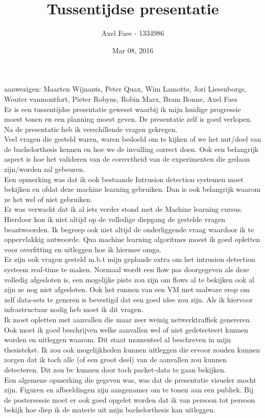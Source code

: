 \documentclass[notitlepage]{article}
\title{Tussentijdse presentatie}
\author{Axel Faes - 1334986}
\date{Mar 08, 2016}
\begin{document}
\maketitle

aanwezigen: Maarten Wijnants, Peter Quax, Wim Lamotte, Jori Liesenborgs, Wouter vanmontfort, Pieter Robyns, Robin Marx, Bram Bonne, Axel Faes\\

Er is een tussentijdse presentatie geweest waarbij ik mijn huidige progressie moest tonen en een planning moest geven. De presentatie zelf is goed verlopen. Na de presentatie heb ik verschillende vragen gekregen. \\

Veel vragen die gesteld waren, waren bedoeld om te kijken of we het nut/doel van de bachelorthesis kennen en hoe we de invulling correct doen. Ook een belangrijk aspect is hoe het valideren van de correctheid van de experimenten die gedaan zijn/worden zal gebeuren. \\

Een opmerking was dat ik ook bestaande Intrusion detection systemen moet bekijken en ofdat deze machine learning gebruiken. Dan is ook belangrijk waarom ze het wel of niet gebruiken. \\

Er was verwacht dat ik al iets verder stond met de Machine learning cursus. Hierdoor kon ik niet altijd op de volledige diepgang de gestelde vragen beantwoorden. Ik begreep ook niet altijd de onderliggende vraag waardoor ik te oppervlakkig antwoorde. Qua machine learning algoritmes moest ik goed opletten voor overfitting en uitleggen hoe ik hiermee omga.\\

Er zijn ook vragen gesteld m.b.t mijn geplande extra om het intrusion detection systeem real-time te maken. Normaal wordt een flow pas doorgegeven als deze volledig afgesloten is, een mogelijke piste zou zijn om flows al te bekijken ook al zijn ze nog niet afgesloten. Ook het runnen van een VM met malware erop om zelf data-sets te generen is bevestigd dat een goed idee zou zijn. Als ik hiervoor infrastructuur nodig heb moet ik dit vragen.\\

Ik moet opletten met aanvallen die maar zeer weinig netwerktraffiek genereren. Ook moet ik goed beschrijven welke aanvallen wel of niet gedetecteert kunnen worden en uitleggen waarom. Dit staat momenteel al beschreven in mijn thesistekst. Ik zou ook mogelijkheden kunnen uitleggen die ervoor zouden kunnen zorgen dat ik toch alle (of een groot deel) van de aanvallen zou kunnen detecteren. Dit zou bv kunnen door toch packet-data te gaan bekijken.\\

Een algemene opmerking die gegeven was, was dat de presentatie visueler mocht zijn. Figuren en afbeeldingen zijn aangenamer om te tonen aan een publiek. Bij de postersessie moet er ook goed opgelet worden dat ik van persoon tot persoon bekijk hoe diep ik de materie uit mijn bachelorthesis kan uitleggen. 
\end{document}
